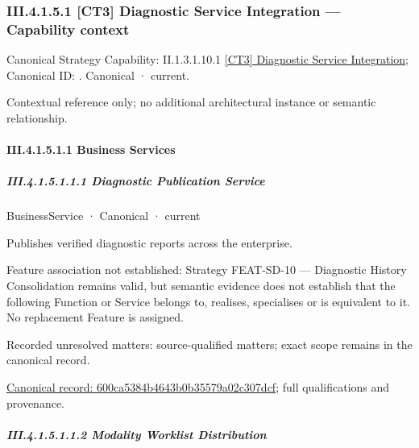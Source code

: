 \subsubsection*{III.4.1.5.1 [CT3] Diagnostic Service Integration — Capability context}
\label{navigation:III.4.1.5.1}

{\small Canonical Strategy Capability: II.1.3.1.10.1 \hyperref[element:9ded2f3a28d24017bb921a0cdcf65a2b]{[CT3] Diagnostic Service Integration}; Canonical ID: \texttt{}. Canonical · current.}\par
Contextual reference only; no additional architectural instance or semantic relationship.\par
\paragraph*{III.4.1.5.1.1 Business Services}
\label{navigation:III.4.1.5.1.1}

\subparagraph*{III.4.1.5.1.1.1 Diagnostic Publication Service}
\label{navigation:III.4.1.5.1.1.1}

\label{element:600ca5384b4643b0b35579a02c307dcf}
{\small BusinessService · Canonical · current}\par

Publishes verified diagnostic reports across the enterprise.



Feature association not established: Strategy FEAT-SD-10 — Diagnostic History Consolidation remains valid, but semantic evidence does not establish that the following Function or Service belongs to, realises, specialises or is equivalent to it. No replacement Feature is assigned.


{\small Recorded unresolved matters: source-qualified matters; exact scope remains in the canonical record.}\par
{\footnotesize \href{../../../../continuum/business/business-service/600ca5384b4643b0b35579a02c307dcf.md}{Canonical record: 600ca5384b4643b0b35579a02c307dcf}; full qualifications and provenance.}\par
\subparagraph*{III.4.1.5.1.1.2 Modality Worklist Distribution}
\label{navigation:III.4.1.5.1.1.2}

